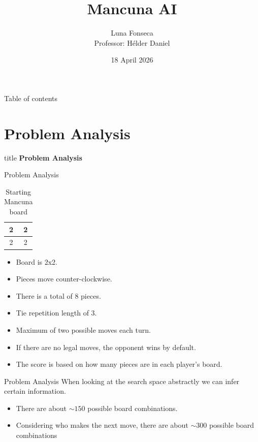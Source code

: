 \documentclass[11pt]{beamer}
\author[Luna Fonseca]{Luna Fonseca \\ Professor: Hélder Daniel}
\title[Mancuna AI]{Mancuna AI}
\institute[]{UALG \par MASTERS IN INFORMATICS ENGINEERING}
\date{18 April 2026}
\begin{document}
\begin{frame}
	\titlepage
\end{frame}

\begin{frame}{Table of contents}
\end{frame}


\section{Problem Analysis}

\begin{frame}
    \begin{beamercolorbox}[sep=8pt,center,rounded=true,shadow=true]{title}
		\Huge\textbf{Problem Analysis}
    \end{beamercolorbox}
\end{frame}

\begin{frame}{Problem Analysis}
	\begin{center}
		\begin{table}
			\begin{center}
				\begin{tabular}{| c | c |}
					2 & 2\\
					\hline
					\hline
					2 & 2\\
				\end{tabular}
				\caption{Starting Mancuna board}
			\end{center}
		\end{table}
	\end{center}
	\begin{itemize}
		\item Board is 2x2.
		\item Pieces move counter-clockwise.
		\item There is a total of 8 pieces.
		\item Tie repetition length of 3.
		\item Maximum of two possible moves each turn.
		\item If there are no legal moves, the opponent wins by default.
		\item The score is based on how many pieces are in each player's board.
	\end{itemize}
\end{frame}

\begin{frame}{Problem Analysis}
	When looking at the search space abstractly we can infer certain information.
	\begin{itemize}
		\item There are about $\sim 150$ possible board combinations.
		\item Considering who makes the next move, there are about $\sim 300$ possible board combinations
	\end{itemize}
\end{frame}
\end{document}

